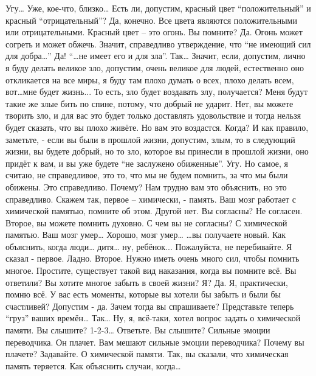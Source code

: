 \documentclass{extbook}
\newcommand{\soul}[1]{{#1}}
\newcommand{\people}[1]{{#1}}
\begin{document}
\people{Угу… Уже, кое-что, близко… Есть ли, допустим, красный  цвет ``положительный'' и  красный  ``отрицательный''? }
\soul{Да, конечно. Все цвета являются положительными или отрицательными. Красный цвет – это огонь. Вы помните? }
\people{Да.}
\soul{Огонь может согреть и может обжечь.}
\people{Значит, справедливо утверждение,  что ``не имеющий сил для добра…}''
\soul{Да!}
\people{``…не имеет его и для зла''.  Так… Значит, если, допустим, лично я буду делать великое зло,  допустим, очень великое для людей, естественно оно откликается  на все миры, я буду там  плохо думать о всех,  плохо делать всем, вот…мне будет жизнь... То есть, зло будет воздавать злу, получается? Меня будут такие же злые бить по спине, потому, что добрый не ударит. }
\soul{Нет, вы можете творить зло, и для вас это будет только доставлять удовольствие  и тогда  нельзя будет сказать, что вы плохо живёте. Но вам это воздастся.}
\people{Когда?}
\soul{И как правило, заметьте, - если вы были в прошлой жизни, допустим, злым, то в следующий жизни, вы будете добрый, но то зло, которое вы принесли в прошлой жизни, оно придёт  к вам, и вы уже будете ``не заслужено обиженные''.}
\people{Угу. Но самое, я считаю, не справедливое, это то, что мы не будем помнить, за что мы были обижены.}
\soul{Это справедливо.}
\people{Почему?}
\soul{Нам трудно вам это объяснить, но это справедливо. Скажем так, первое – химически, - память. Ваш мозг работает  с химической памятью, помните об этом.  Другой  нет. Вы согласны?}
\people{Не согласен.}
\soul{Второе, вы можете помнить духовно.  С чем вы не согласны?}
\people{С химической памятью.}
\soul{Ваш мозг умер…}
\people{Хорошо,  мозг умер…}
\soul{…вы получаете новый.}
\people{Как объяснить, когда люди…  дитя… ну, ребёнок...}
\soul{Пожалуйста, не перебивайте. Я сказал - первое.}
\people{Ладно.}
\soul{Второе. Нужно иметь очень много сил, чтобы помнить многое.  Простите, существует  такой вид наказания, когда вы помните всё.}
\people{Вы ответили?}
\soul{Вы хотите многое забыть в своей жизни?}
\people{Я? }
\soul{Да.}
\people{Я, практически, помню всё. }
\soul{У вас есть моменты, которые  вы хотели бы забыть и были бы счастливей?}
\people{Допустим - да.}
\soul{Зачем тогда вы спрашиваете? Представьте теперь ``груз'' ваших времён… }
\people{Так… Ну, я, всё-таки, хотел вопрос задать о химической памяти. Вы слышите?}
1-2-3…
\people{Ответьте. Вы слышите?}
\soul{Сильные эмоции  переводчика. Он плачет.}
\people{Вам мешают сильные эмоции переводчика?}
\soul{ Почему вы плачете? Задавайте.}
\people{О химической памяти. Так, вы сказали, что химическая память теряется. Как объяснить случаи, когда…}
\end{document}
